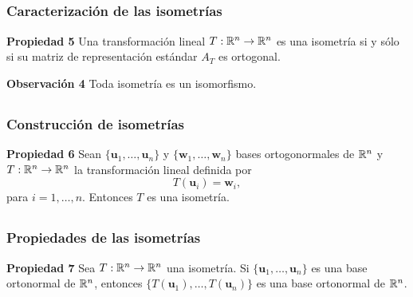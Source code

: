 
\subsection{}

\begin{frame}\frametitle{Caracterización de las isometrías}

\begin{prop}{\textbf{Propiedad 5}}
	\justifying
	Una transformación lineal $T:\mathbb{R}^n\to \mathbb{R}^n$ es una isometría si y sólo si su
	matriz de representación estándar $A_T$ es ortogonal.	
\end{prop}	

\begin{alertblock}{\textbf{Observación 4}}
	Toda isometría es un isomorfismo.
\end{alertblock}

\end{frame}


\subsection{}

\begin{frame}\frametitle{Construcción de isometrías}
	
	\begin{prop}{\textbf{Propiedad 6}}
		\justifying
		Sean $\{ \mathbf{u}_1,\hdots, \mathbf{u}_n \}$ y $\{ \mathbf{w}_1,\hdots, \mathbf{w}_n \}$ bases
		ortogonormales de $\mathbb{R}^n$ y $T:\mathbb{R}^n\to \mathbb{R}^n$ la transformación lineal definida por
		\[
			T(\mathbf{u}_i) = \mathbf{w}_i,
		\]
		para $i=1,\hdots,n$. Entonces $T$ es una isometría.
	\end{prop}	
	
\end{frame}


\subsection{}

\begin{frame}\frametitle{Propiedades de las isometrías}
		
	\begin{prop}{\textbf{Propiedad 7}}
		\justifying
		Sea $T:\mathbb{R}^n\to \mathbb{R}^n$ una isometría. Si $\{ \mathbf{u}_1,\hdots, \mathbf{u}_n \}$ es una base ortonormal 
		de $\mathbb{R}^n$, entonces $\{ T(\mathbf{u}_1),\hdots, T(\mathbf{u}_n) \}$ es una base ortonormal de $\mathbb{R}^n$.
	\end{prop}	
	
\end{frame}

